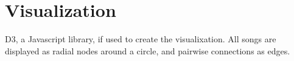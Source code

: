 \section{Visualization}

D3, a Javascript library, if used to create the visualixation. All songs are displayed as radial nodes around a circle, and pairwise connections as edges.